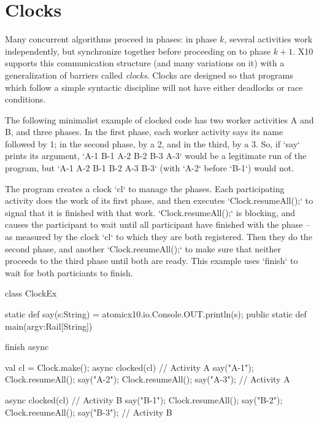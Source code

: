 \chapter{Clocks}\label{XtenClocks}

Many concurrent algorithms proceed in phases: in phase {$k$}, several
activities work independently, but synchronize together before proceeding on
to phase {$k+1$}. X10 supports this communication structure (and many
variations on it) with a generalization of barriers 
called {\em clocks}. Clocks are designed so that programs which follow a
simple syntactic discipline will not have either deadlocks or race conditions.


The following minimalist example of clocked code has two worker activities A
and B, and three phases. In the first phase, each worker activity says its
name followed by 1; in the second phase, by a 2, and in the third, by a 3.  
So, if \xcd`say` prints its argument, 
\xcd`A-1 B-1 A-2 B-2 B-3 A-3`
would be a legitimate run of the program, but
\xcd`A-1 A-2 B-1 B-2 A-3 B-3`
(with \xcd`A-2` before \xcd`B-1`) would not.

The program creates a clock \xcd`cl` to manage the phases.  Each participating
activity does
the work of its first phase, and then executes \xcd`Clock.resumeAll();` to
signal that it 
is finished with that work. \xcd`Clock.resumeAll();` is blocking, and causes the participant to
wait until all participant have finished with the phase -- as measured by the
clock \xcd`cl` to which they are both registered.  
Then they do the second phase, and another \xcd`Clock.resumeAll();` to make sure that
neither proceeds to the third phase until both are ready.  This example uses
\xcd`finish` to wait for both particiants to finish.  




\begin{xten}
class ClockEx {
  static def say(s:String) = 
     { atomic{x10.io.Console.OUT.println(s);} }
  public static def main(argv:Rail[String]) {
    finish async{
      val cl = Clock.make();
      async clocked(cl) {// Activity A
        say("A-1");
        Clock.resumeAll();
        say("A-2");
        Clock.resumeAll();
        say("A-3"); 
      }// Activity A

      async clocked(cl) {// Activity B
        say("B-1");
        Clock.resumeAll();
        say("B-2");
        Clock.resumeAll();
        say("B-3"); 
      }// Activity B
    }
  }
 }
\end{xten}

